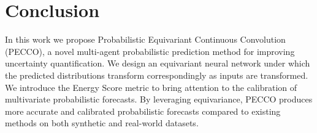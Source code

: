 \section{Conclusion}
In this work we propose Probabilistic Equivariant Continuous Convolution (PECCO),  a novel  multi-agent probabilistic prediction method for improving uncertainty quantification. We design an equivariant neural network under which the predicted distributions transform correspondingly as inputs are transformed. We introduce the Energy Score metric to bring attention to the calibration of multivariate probabilistic forecasts. By leveraging equivariance, PECCO produces more accurate and calibrated probabilistic forecasts compared to existing methods on both synthetic and real-world datasets.

